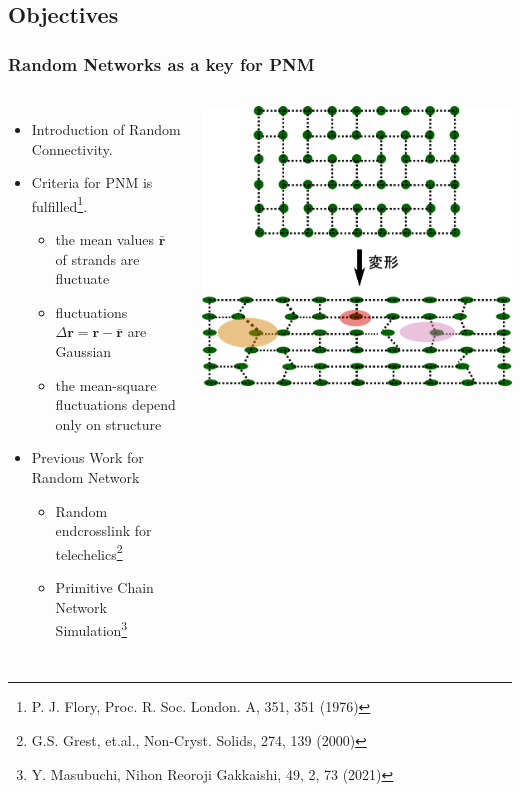 \documentclass[12pt, dvipdfmx]{beamer}
\begin{document}
\subsection{Objectives}
\setcounter{footnote}{0}
\begin{frame}
	\frametitle{Random Networks as a key for PNM}
		\begin{columns}[c, onlytextwidth]
			\begin{itemize}
				\item Introduction of \alert{Random Connectivity}.
					\item \alert{Criteria for PNM} is fulfilled\footnote{
								\scriptsize{P. J. Flory, Proc. R. Soc. London. A, 351, 351 (1976)}
						}.
					\begin{itemize}
						\item the mean values $\bar{\bm{r}}$ of strands are \alert{fluctuate}
						\item fluctuations $\Delta \bm{r} = \bm{r} - \bar{\bm{r}}$ are \alert{Gaussian}
						\item the mean-square fluctuations \alert{depend only on structure}
					\end{itemize}
				\item Previous Work for Random Network
				\begin{itemize}
					\item \alert{Random endcrosslink for telechelics}\footnote{
						\scriptsize{G.S. Grest, et.al., Non-Cryst. Solids, 274, 139 (2000)}
						}
					\item \alert{Primitive Chain Network Simulation}\footnote{
						\scriptsize{Y. Masubuchi, Nihon Reoroji Gakkaishi, 49, 2, 73 (2021)}
					}
				\end{itemize}
			\end{itemize}
				\centering
					\includegraphics[width=\textwidth]{random_NW.png}
		\end{columns}


\end{frame}
\end{document}
